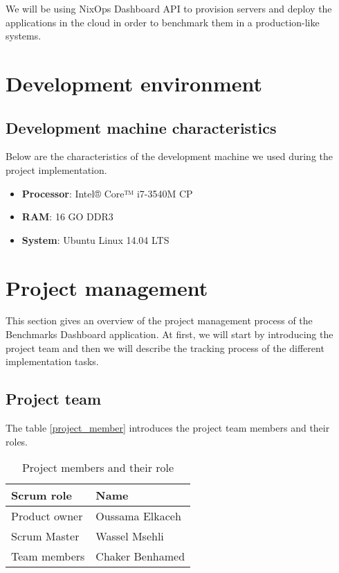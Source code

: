 We will be using NixOps Dashboard API to provision servers and deploy the
applications in the cloud in order to benchmark them in a production-like
systems.

\section{Development environment}
\subsection{Development machine characteristics}
Below are the characteristics of the development machine we used during the
project implementation.

\begin{itemize}
  \item{\textbf{Processor}: Intel® Core™ i7-3540M CP}
  \item{\textbf{RAM}: 16 GO DDR3 }
  \item{\textbf{System}: Ubuntu Linux 14.04 LTS}
\end{itemize}


\section{Project management}
This section gives an overview of the project management process of the
Benchmarks Dashboard application. At first, we will start by introducing the
project team and then we will describe the tracking process of the different
implementation tasks.
\subsection{Project team}
The table \hyperref[project_members]{\ref{project_member}} introduces the project team members and their roles.

\begin{table}[]
\centering
\label{project_members}
  \begin{tabular}{ | p{3cm}  | p{6cm} |}
    \hline

    Scrum role    & Name          \\ \hline

    Product owner & Oussama Elkaceh \\ \hline
    Scrum Master  & Wassel Msehli   \\ \hline
    Team members  & Chaker Benhamed \\ \hline

    \hline
  \end{tabular}
\caption{Project members and their role}
\end{table}

